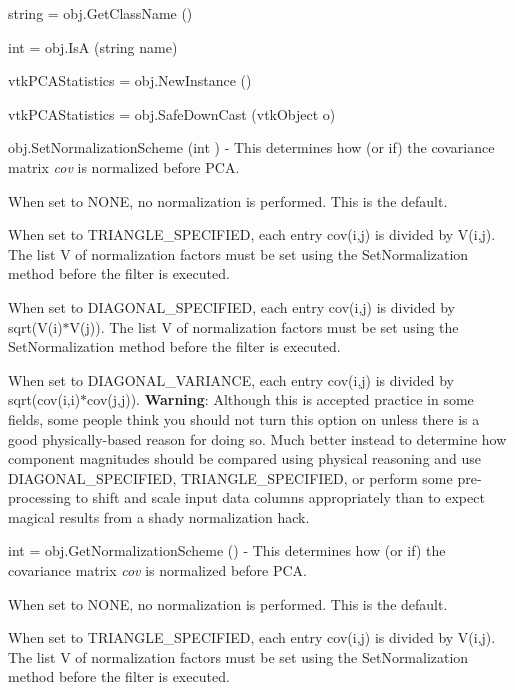 \begin{DoxyItemize}
\item {\ttfamily string = obj.\-Get\-Class\-Name ()}  
\item {\ttfamily int = obj.\-Is\-A (string name)}  
\item {\ttfamily vtk\-P\-C\-A\-Statistics = obj.\-New\-Instance ()}  
\item {\ttfamily vtk\-P\-C\-A\-Statistics = obj.\-Safe\-Down\-Cast (vtk\-Object o)}  
\item {\ttfamily obj.\-Set\-Normalization\-Scheme (int )} -\/ This determines how (or if) the covariance matrix {\itshape cov} is normalized before P\-C\-A.

When set to N\-O\-N\-E, no normalization is performed. This is the default.

When set to T\-R\-I\-A\-N\-G\-L\-E\-\_\-\-S\-P\-E\-C\-I\-F\-I\-E\-D, each entry cov(i,j) is divided by V(i,j). The list V of normalization factors must be set using the Set\-Normalization method before the filter is executed.

When set to D\-I\-A\-G\-O\-N\-A\-L\-\_\-\-S\-P\-E\-C\-I\-F\-I\-E\-D, each entry cov(i,j) is divided by sqrt(V(i)$\ast$\-V(j)). The list V of normalization factors must be set using the Set\-Normalization method before the filter is executed.

When set to D\-I\-A\-G\-O\-N\-A\-L\-\_\-\-V\-A\-R\-I\-A\-N\-C\-E, each entry cov(i,j) is divided by sqrt(cov(i,i)$\ast$cov(j,j)). {\bfseries Warning}\-: Although this is accepted practice in some fields, some people think you should not turn this option on unless there is a good physically-\/based reason for doing so. Much better instead to determine how component magnitudes should be compared using physical reasoning and use D\-I\-A\-G\-O\-N\-A\-L\-\_\-\-S\-P\-E\-C\-I\-F\-I\-E\-D, T\-R\-I\-A\-N\-G\-L\-E\-\_\-\-S\-P\-E\-C\-I\-F\-I\-E\-D, or perform some pre-\/processing to shift and scale input data columns appropriately than to expect magical results from a shady normalization hack.  
\item {\ttfamily int = obj.\-Get\-Normalization\-Scheme ()} -\/ This determines how (or if) the covariance matrix {\itshape cov} is normalized before P\-C\-A.

When set to N\-O\-N\-E, no normalization is performed. This is the default.

When set to T\-R\-I\-A\-N\-G\-L\-E\-\_\-\-S\-P\-E\-C\-I\-F\-I\-E\-D, each entry cov(i,j) is divided by V(i,j). The list V of normalization factors must be set using the Set\-Normalization method before the filter is executed.


\end{DoxyItemize}
